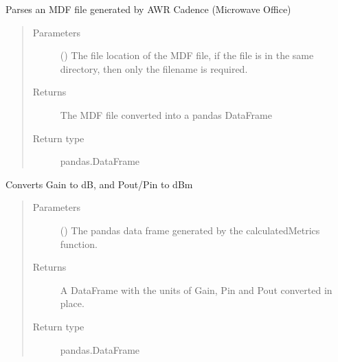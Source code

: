 \documentclass[letterpaper,10pt,openany,oneside,english]{sphinxmanual}
\begin{document}
\begin{fulllineitems}
\label{\detokenize{index:loadPullDataAnalysis.mdfParser.parseMdf}}
\sphinxAtStartPar
Parses an MDF file generated by AWR Cadence (Microwave Office)
\begin{quote}\begin{description}
\item[{Parameters}] \leavevmode
\sphinxAtStartPar
{} () \textendash{} The file location of the MDF file, if the file is in the same directory,
then only the filename is required.

\item[{Returns}] \leavevmode
\sphinxAtStartPar
The MDF file converted into a pandas DataFrame

\item[{Return type}] \leavevmode
\sphinxAtStartPar
pandas.DataFrame

\end{description}\end{quote}

\end{fulllineitems}


\begin{fulllineitems}
\label{\detokenize{index:loadPullDataAnalysis.mdfParser.unitConversions}}
\sphinxAtStartPar
Converts Gain to dB, and Pout/Pin to dBm
\begin{quote}\begin{description}
\item[{Parameters}] \leavevmode
\sphinxAtStartPar
{} () \textendash{} The pandas data frame generated by the calculatedMetrics function.

\item[{Returns}] \leavevmode
\sphinxAtStartPar
A DataFrame with the units of Gain, Pin and Pout converted in place.

\item[{Return type}] \leavevmode
\sphinxAtStartPar
pandas.DataFrame

\end{description}\end{quote}

\end{fulllineitems}




\renewcommand{\indexname}{Index}
\printindex
\end{document}

